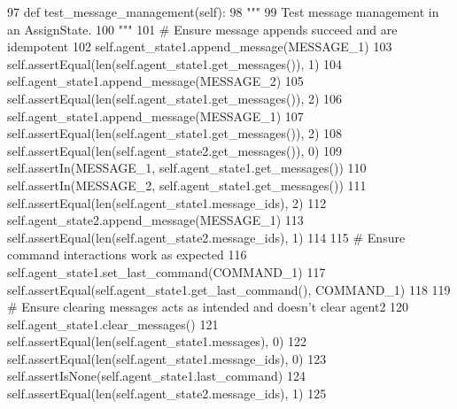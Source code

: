 \begin{DoxyCode}
97     \textcolor{keyword}{def }test\_message\_management(self):
98         \textcolor{stringliteral}{"""}
99 \textcolor{stringliteral}{        Test message management in an AssignState.}
100 \textcolor{stringliteral}{        """}
101         \textcolor{comment}{# Ensure message appends succeed and are idempotent}
102         self.agent\_state1.append\_message(MESSAGE\_1)
103         self.assertEqual(len(self.agent\_state1.get\_messages()), 1)
104         self.agent\_state1.append\_message(MESSAGE\_2)
105         self.assertEqual(len(self.agent\_state1.get\_messages()), 2)
106         self.agent\_state1.append\_message(MESSAGE\_1)
107         self.assertEqual(len(self.agent\_state1.get\_messages()), 2)
108         self.assertEqual(len(self.agent\_state2.get\_messages()), 0)
109         self.assertIn(MESSAGE\_1, self.agent\_state1.get\_messages())
110         self.assertIn(MESSAGE\_2, self.agent\_state1.get\_messages())
111         self.assertEqual(len(self.agent\_state1.message\_ids), 2)
112         self.agent\_state2.append\_message(MESSAGE\_1)
113         self.assertEqual(len(self.agent\_state2.message\_ids), 1)
114 
115         \textcolor{comment}{# Ensure command interactions work as expected}
116         self.agent\_state1.set\_last\_command(COMMAND\_1)
117         self.assertEqual(self.agent\_state1.get\_last\_command(), COMMAND\_1)
118 
119         \textcolor{comment}{# Ensure clearing messages acts as intended and doesn't clear agent2}
120         self.agent\_state1.clear\_messages()
121         self.assertEqual(len(self.agent\_state1.messages), 0)
122         self.assertEqual(len(self.agent\_state1.message\_ids), 0)
123         self.assertIsNone(self.agent\_state1.last\_command)
124         self.assertEqual(len(self.agent\_state2.message\_ids), 1)
125 
\end{DoxyCode}
\mbox{\label{classparlai_1_1mturk_1_1core_1_1test_1_1test__mturk__agent_1_1TestAssignState_a1fdcb1c28571335a629b2a8bdb1762bc}} 
